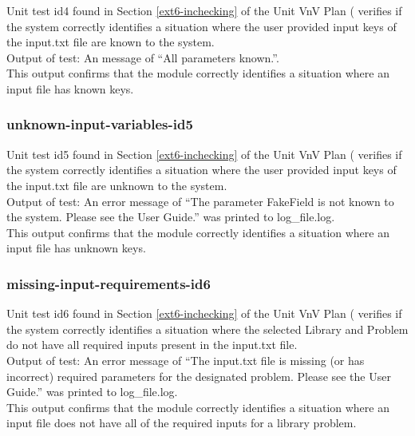 \documentclass[12pt, titlepage]{article}
\begin{document}
Unit test id4 found in Section \ref{ext6-inchecking} of the Unit VnV Plan (\citet{LBM_UVNV_PM} verifies if the system correctly identifies a situation where the user provided input keys of the input.txt file are known to the system.\\

\noindent Output of test: An message of ``All parameters known.''.\\

\noindent This output confirms that the module correctly identifies a situation where an input file has known keys.

\subsubsection{unknown-input-variables-id5}

Unit test id5 found in Section \ref{ext6-inchecking} of the Unit VnV Plan (\citet{LBM_UVNV_PM} verifies if the system correctly identifies a situation where the user provided input keys of the input.txt file are unknown to the system.\\

\noindent Output of test: An error message of ``The parameter FakeField is not known to the system. Please see the User Guide.''  was printed to log\_file.log.\\

\noindent This output confirms that the module correctly identifies a situation where an input file has unknown keys.

\subsubsection{missing-input-requirements-id6}

Unit test id6 found in Section \ref{ext6-inchecking} of the Unit VnV Plan (\citet{LBM_UVNV_PM} verifies if the system correctly identifies a situation where the selected Library and Problem do not have all required inputs present in the input.txt file.\\

\noindent Output of test: An error message of ``The input.txt file is missing (or has incorrect) required parameters for the designated problem. Please see the User Guide.'' was printed to log\_file.log.\\

\noindent This output confirms that the module correctly identifies a situation where an input file does not have all of the required inputs for a library problem.
\end{document}
